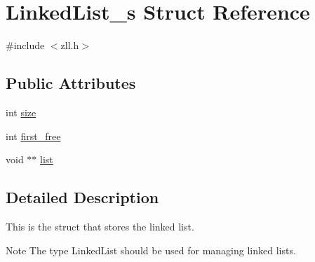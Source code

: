 \hypertarget{structLinkedList__s}{\section{Linked\-List\-\_\-s Struct Reference}
\label{structLinkedList__s}
}


{\ttfamily \#include $<$zll.\-h$>$}

\subsection*{Public Attributes}
\begin{DoxyCompactItemize}
\item 
int \hyperlink{structLinkedList__s_a66dae0b85d9813aff866a6f019938106}{size}
\item 
int \hyperlink{structLinkedList__s_ac0687733b34ef2658a8e6d2c9b7a31fa}{first\-\_\-free}
\item 
void $\ast$$\ast$ \hyperlink{structLinkedList__s_a9ce880a77ea68ef9fd37c400d0fc1909}{list}
\end{DoxyCompactItemize}


\subsection{Detailed Description}
This is the struct that stores the linked list. \begin{DoxyNote}{Note}
The type Linked\-List should be used for managing linked lists. 
\end{DoxyNote}


